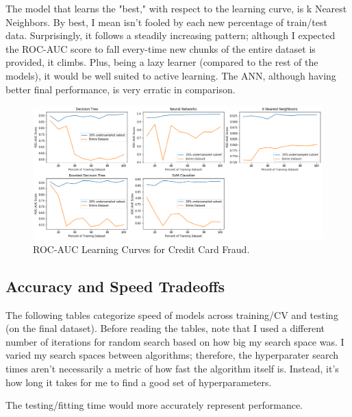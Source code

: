 \documentclass[a4paper]{article}
\begin{document}
The model that learns the "best," with respect to the learning curve, is k Nearest Neighbors. By best, I mean isn't fooled by each new percentage of train/test data. Surprisingly, it follows a steadily increasing pattern; although I expected the ROC-AUC score to fall every-time new chunks of the entire dataset is provided, it climbs. Plus, being a lazy learner (compared to the rest of the models), it would be well suited to active learning. The ANN, although having better final performance, is very erratic in comparison. 
\begin{figure}
  \centering
  \includegraphics[width=1\textwidth]{images/trialbyfire.png}
  \caption{ROC-AUC Learning Curves for Credit Card Fraud.}
\end{figure}
\subsection{Accuracy and Speed Tradeoffs}
The following tables categorize speed of models across training/CV and testing (on the final dataset). Before reading the tables, note that I used a different number of iterations for random search based on how big my search space was. I varied my search spaces between algorithms; therefore, the hyperparater search times aren't necessarily a metric of how fast the algorithm itself is. Instead, it's how long it takes for me to find a good set of hyperparameters.

The testing/fitting time would more accurately represent performance.
\end{document}
